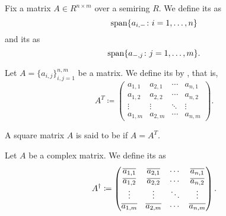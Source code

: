 \begin{definition}\label{def:matrix_column_and_row_space}
  Fix a matrix \( A \in R^{n \times m} \) over a semiring \( R \). We define its  as
  \begin{equation*}
    \operatorname{span} \{ a_{i,-} \colon i = 1, \ldots, n \}
  \end{equation*}
  and its  as
  \begin{equation*}
    \operatorname{span} \{ a_{-,j} \colon j = 1, \ldots, m \}.
  \end{equation*}
\end{definition}

\begin{definition}\label{def:matrix_transpose}
  Let \( A = \{ a_{i,j} \}_{i,j=1}^{n,m} \) be a matrix. We define its  by , that is,
  \begin{equation*}
    A^T \coloneqq \begin{pmatrix}
      a_{1,1} & a_{2,1} & \cdots & a_{n,1} \\
      a_{1,2} & a_{2,2} & \cdots & a_{n,2} \\
      \vdots  & \vdots  & \ddots & \vdots \\
      a_{1,m} & a_{2,m} & \cdots & a_{n,m}
    \end{pmatrix}.
  \end{equation*}
\end{definition}

\begin{definition}\label{def:symmetric_matrix}
  A square matrix \( A \) is said to be  if \( A = A^T \).
\end{definition}

\begin{definition}\label{def:matrix_conjugate_transpose}
  Let \( A \) be a complex matrix. We define its  as
  \begin{equation*}
    A^\dagger \coloneqq \begin{pmatrix}
      \overline{a_{1,1}} & \overline{a_{2,1}} & \cdots & \overline{a_{n,1}} \\
      \overline{a_{1,2}} & \overline{a_{2,2}} & \cdots & \overline{a_{n,2}} \\
      \vdots  & \vdots  & \ddots & \vdots \\
      \overline{a_{1,m}} & \overline{a_{2,m}} & \cdots & \overline{a_{n,m}}
    \end{pmatrix}.
  \end{equation*}
\end{definition}

